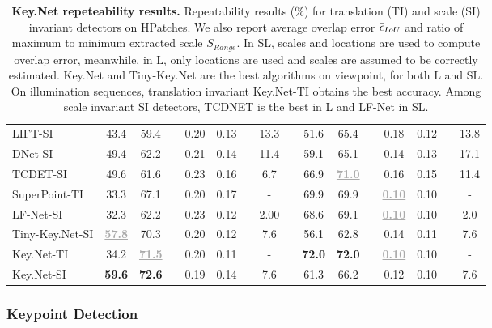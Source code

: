 \begin{landscape}
\begin{table}[!tbh]
\begin{center}
\begin{tabular}{lccccccclccccccc}
LIFT-SI \cite{LIFT}                    & 43.4 & 59.4 && 0.20 & 0.13 && 13.3 && 51.6 & 65.4 && 0.18 & 0.12 && 13.8 \\
DNet-SI \cite{Karel_Vedaldi_ECCV_16}   & 49.4 & 62.2 && 0.21 & 0.14 && 11.4 && 59.1 & 65.1 && 0.14 & 0.13 && 17.1 \\
TCDET-SI \cite{Zhang_Felix_CVPR_17}    & 49.6 & 61.6 && 0.23 & 0.16 && 6.7 && 66.9 & \textbf{\textcolor{darkgray}{\underline{71.0}}} && 0.16 & 0.15 && 11.4 \\
SuperPoint-TI \cite{detone2017superpoint} & 33.3 & 67.1 && 0.20 & 0.17 && - && 69.9 & 69.9 && \textbf{\textcolor{darkgray}{\underline{0.10}}} & 0.10 && - \\
LF-Net-SI \cite{OnoSerra18}            & 32.3 & 62.2 && 0.23 & 0.12 && 2.00 && 68.6 & 69.1 && \textbf{\textcolor{darkgray}{\underline{0.10}}} & 0.10 && 2.0 \\
\noalign{\smallskip}
\hline
\noalign{\smallskip}
Tiny-Key.Net-SI & \textbf{\textcolor{darkgray}{\underline{57.8}}} & 70.3 && 0.20 & 0.12 && 7.6 && 56.1 & 62.8 && 0.14 & 0.11 && 7.6 \\
Key.Net-TI & 34.2 & \textbf{\textcolor{darkgray}{\underline{71.5}}} && 0.20 & 0.11 && - && \textbf{72.0} & \textbf{72.0} && \textbf{\textcolor{darkgray}{\underline{0.10}}} & 0.10 && - \\

Key.Net-SI & \textbf{59.6} & \textbf{72.6} && 0.19 & 0.14 && 7.6 && 61.3 & 66.2 && 0.12 & 0.10 && 7.6 \\
\end{tabular}
\caption[Key.Net repeteability results]{\textbf{Key.Net repeteability results.} Repeatability results (\%) for translation (TI) and scale (SI) invariant detectors on HPatches. We also report average overlap error $\Bar{\epsilon}_{IoU}$ and ratio of maximum to minimum extracted scale $S_{Range}$. In SL, scales and locations are used to compute overlap error, meanwhile, in L, only locations are used and scales are assumed to be correctly estimated. Key.Net and Tiny-Key.Net are the best algorithms on viewpoint, for both L and SL. On illumination sequences, translation invariant Key.Net-TI obtains the best accuracy. Among scale invariant SI detectors, TCDNET is the best in L and LF-Net in SL.}
\label{table:repeatability_scores}
\end{center}
\end{table}
\end{landscape}


\subsubsection{Keypoint Detection}

